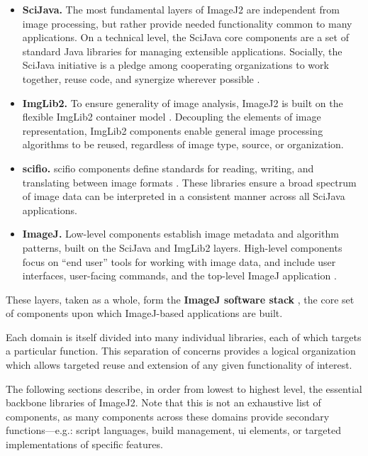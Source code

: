 \documentclass{bmcart}
\begin{document}
\begin{itemize}
  \item \textbf{SciJava.} The most fundamental layers of ImageJ2 are
    independent from image processing, but rather provide needed functionality
    common to many applications. On a technical level, the SciJava core
    components are a set of standard Java libraries for managing extensible
    applications. Socially, the SciJava initiative is a pledge among
    cooperating organizations to work together, reuse code, and synergize
    wherever possible \cite{imagej_scijava}.
  \item \textbf{ImgLib2.} To ensure generality of image analysis, ImageJ2 is
    built on the flexible ImgLib2 container model \cite{imglib2}. Decoupling the
    elements of image representation, ImgLib2 components enable general image
    processing algorithms to be reused, regardless of image type, source, or
    organization.
  \item \textbf{\acrfull{scifio}.} \acrshort{scifio} components define
    standards for reading, writing, and translating between image formats
    \cite{scifio}. These libraries ensure a broad spectrum of image data can be
    interpreted in a consistent manner across all SciJava applications.
  \item \textbf{ImageJ.} Low-level components establish image metadata and algorithm
    patterns, built on the SciJava and ImgLib2 layers. High-level
    components focus on ``end user'' tools for working with image data,
    and include user interfaces, user-facing commands, and the top-level
    ImageJ application \cite{imagej_web_site}.
\end{itemize}

These layers, taken as a whole, form the \textbf{ImageJ software stack}
\cite{imagej_architecture}, the core set of components upon which ImageJ-based
applications are built.

Each domain is itself divided into many individual libraries, each of which
targets a particular function. This separation of concerns provides a logical
organization which allows targeted reuse and extension of any given
functionality of interest.

The following sections describe, in order from lowest to highest level, the
essential backbone libraries of ImageJ2. Note that this is not an exhaustive
list of components, as many components across these domains provide secondary
functions---e.g.: script languages, build management, \acrshort{ui} elements,
or targeted implementations of specific features.
\end{document}
